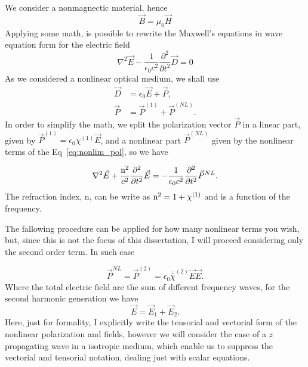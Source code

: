 We consider a nonmagnectic material, hence
\begin{equation}
    \vec{B} = \mu_0 \vec{H}
\end{equation}
%
Applying some math, is possible to rewrite the Maxwell's equations in wave equation form for the electric field 
\begin{equation}
    \nabla^2\vec{E} - \frac{1}{\epsilon_0 c^2}\frac{\partial^2}{\partial t^2}\vec{D} = 0
\end{equation}
As we considered a nonlinear optical medium, we shall use
\begin{subequations}
    \begin{align}
        \vec{D} &= \epsilon_0\vec{E} +\vec{P},\\
        \vec{P} &= \vec{P}^{(1)} + \vec{P}^{(NL)}.
    \end{align}
\end{subequations}
In order to simplify the math, we split the polarization vector $\vec{P}$ in a linear part, given by $\vec{P}^{(1)} = \epsilon_0\chi^{(1)}\vec{E}$, and a nonlinear part $\vec{P}^{(NL)}$ given by the nonlinear terms of the Eq~\ref{eq:nonlim_pol}, so we have

\begin{equation}
    \nabla^2\vec{E} +\frac{\text{n}^2}{c^2}\frac{\partial^2}{\partial t^2}\vec{E} = -\frac{1}{\epsilon_0 c^2} \frac{\partial^2}{\partial t^2}\vec{P}^{NL}.
    \label{eq:wave_equation_nonlinear}
\end{equation}
The refraction index, n, can be write as $\text{n}^2= 1 + \chi^{(1)}$ and is a function of the frequency.

The fallowing procedure can be applied for how many nonlinear terms you wish, but, since this is not the focus of this dissertation, I will proceed considering only the second order term. In such case

\begin{equation}
    \vec{P}^{NL} = \vec{P}^{(2)} = \epsilon_0\bar{\bar{\chi}}^{(2)}\vec{E}\vec{E}.
    \label{eq:nonlinear_polarization}
\end{equation}
Where the total electric field are the sum of different frequency waves, for the second harmonic generation we have
\begin{equation}
    \vec{E} = \vec{E}_1 + \vec{E}_2.
    \label{eq:total_field}
\end{equation}
Here, just for formality, I explicitly write the tensorial and vectorial form of the nonlinear polarization and fields, however we will consider the case of a $z$ propagating wave in a isotropic medium, which enable us to suppress the vectorial and tensorial notation, dealing just with scalar equations.

